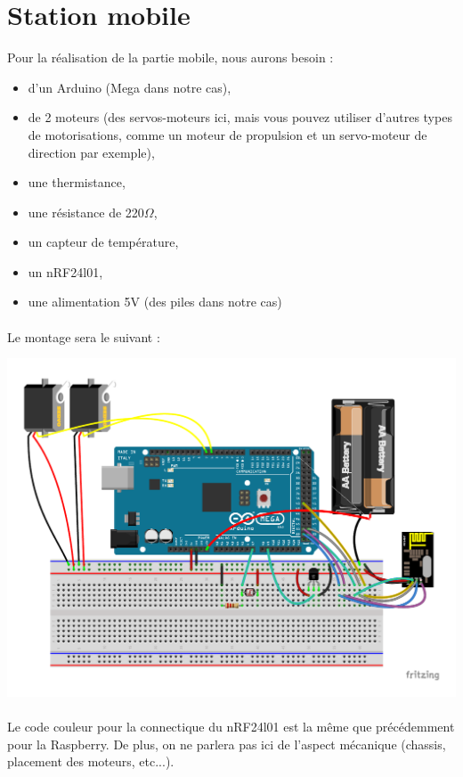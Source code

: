 \section{Station mobile}
Pour la réalisation de la partie mobile, nous aurons besoin :
\begin{itemize}
\item d'un Arduino (Mega dans notre cas),
\item de 2 moteurs (des servos-moteurs ici, mais vous pouvez utiliser d'autres
types de motorisations, comme un moteur de propulsion et un servo-moteur de 
direction par exemple),
\item une thermistance,
\item une résistance de 220$\Omega$,
\item un capteur de température,
\item un nRF24l01,
\item une alimentation 5V (des piles dans notre cas)
\end{itemize}

\paragraph{}
Le montage sera le suivant :
\begin{center}
\includegraphics[scale=0.7]{include/arduino_bb.pdf}
\end{center}

\paragraph{}
Le code couleur pour la connectique du nRF24l01 est la même que précédemment
pour la Raspberry. De plus, on ne parlera pas ici de l'aspect mécanique 
(chassis, placement des moteurs, etc...).
